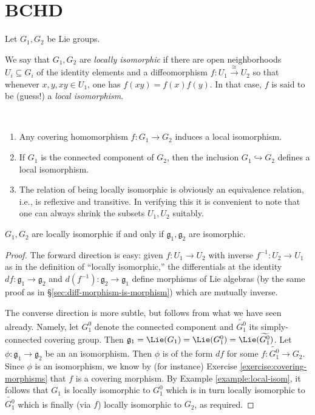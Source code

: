 \documentclass[reqno]{amsart} 
\begin{document}
\section{BCHD}
\label{sec:orgc67fbf4}
Let $G_1, G_2$ be Lie groups.
\begin{definition}
  We say that $G_1,G_2$ are \emph{locally isomorphic} if there are open neighborhoods $U_i \subseteq G_i$ of the identity elements and a diffeomorphism $f : U_1 \xrightarrow{\cong } U_2$ so that whenever $x,y,x y \in U_1$, one has $f(xy)=f(x)f(y)$.  In that case, $f$ is said to be (guess!) a \emph{local isomorphism}.
\end{definition}
\begin{example}\label{example:local-isom}
  ~
  \begin{enumerate}
  \item Any covering homomorphism $f : G_1 \rightarrow G_2$ induces a local isomorphism.
  \item If $G_1$ is the connected component of $G_2$, then the inclusion $G_1 \hookrightarrow G_2$ defines a local isomorphism.
  \item The relation of being locally isomorphic is obviously an equivalence relation, i.e., is reflexive and transitive.  In verifying this it is convenient to note that one can always shrink the subsets $U_1,U_2$ suitably.
  \end{enumerate}
\end{example}
\begin{theorem}\label{thm:local-isom-iff-lie-alg-isom}
  $G_1,G_2$ are locally isomorphic if and only if $\mathfrak{g}_1,\mathfrak{g}_2$ are isomorphic.
\end{theorem}
\begin{proof}
  The forward direction is easy: given $f : U_1 \rightarrow U_2$ with inverse $f^{-1} : U_2 \rightarrow U_1$ as in the definition of ``locally isomorphic,'' the differentials at the identity $d f : \mathfrak{g}_1 \rightarrow \mathfrak{g}_2$ and $d (f^{-1}) : \mathfrak{g}_2 \rightarrow \mathfrak{g}_1$ define morphisms of Lie algebras (by the same proof as in \S\ref{sec:diff-morphism-is-morphism}) which are mutually inverse.

  The converse direction is more subtle, but follows from what we have seen already.  Namely, let $G_1^0$ denote the connected component and $\widetilde{G_1^0}$ its simply-connected covering group.  Then $\mathfrak{g}_1 = \Lie(G_1) = \Lie(G_1^0) = \Lie(\widetilde{G_1^0})$.  Let $\phi : \mathfrak{g}_1 \rightarrow \mathfrak{g}_2$ be an an isomorphism.  Then $\phi$ is of the form $d f$ for some $f : \widetilde{G_1^0} \rightarrow G_2$.  Since $\phi$ is an isomorphism, we know by (for instance) Exercise \ref{exercise:covering-morphisms} that $f$ is a covering morphism.  By Example \ref{example:local-isom}, it follows that $G_1$ is locally isomorphic to $G_1^0$ which is in turn locally isomorphic to $\widetilde{G_1^0}$ which is finally (via $f$) locally isomorphic to $G_2$, as required.
\end{proof}
\end{document}

